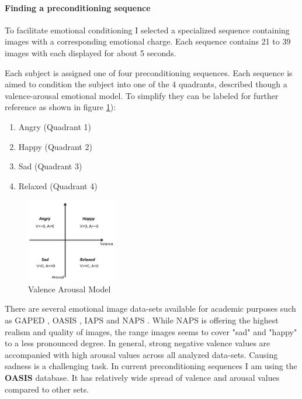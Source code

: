 \paragraph{Finding a preconditioning sequence}
To facilitate emotional conditioning I selected a specialized sequence containing images with a corresponding emotional charge.
Each sequence contains 21 to 39  images with each displayed for about 5 seconds.

Each subject is assigned one of four preconditioning sequences. Each sequence is aimed to condition the subject into one of the 4 quadrants, described though a valence-arousal emotional model. To simplify they can be labeled for further reference as shown in figure \ref{fig:valence_arousal_model}):
\begin{enumerate}
	\item Angry (Quadrant 1)
	\item Happy (Quadrant 2)
	\item Sad (Quadrant 3)
	\item Relaxed (Quadrant 4)
\end{enumerate}


\begin{figure}
\begin{center}
	\includegraphics[width=150px]{graphics/Valence-Arousal-model-showing-the-quadrants-of-the-four-emotion-tags-used-in-this_W640.jpg}
	\caption{Valence Arousal Model \cite{Song2013} \label{fig:valence_arousal_model}}
	
\end{center}
\end{figure}

There are several emotional image data-sets available for academic purposes such as GAPED \cite{Dan-Glauser2011}, OASIS \cite{Kurdi2017}, IAPS \cite{Lang1997} and NAPS \cite{Marchewka2014}. While NAPS is offering the highest realism and quality of images, the range images seems to cover "sad" and "happy" to a less pronounced degree. In general, strong negative valence values are accompanied with high arousal values across all analyzed data-sets. Causing sadness is a challenging task. In current preconditioning sequences I am using the \textbf{OASIS} database. It has relatively wide spread of valence and arousal values compared to other sets.


